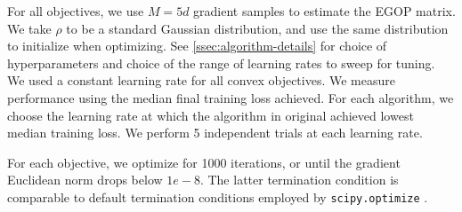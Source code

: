 For all objectives, we use $M = 5d$ gradient samples to estimate the EGOP matrix. We take $\rho$ to be a standard Gaussian distribution, and use the same distribution to initialize when optimizing. See \cref{ssec:algorithm-details} for choice of  hyperparameters and choice of the range of learning rates to sweep for tuning. We used a constant learning rate for all convex objectives. We measure performance using the median final training loss achieved. For each algorithm, we choose the learning rate at which the algorithm in original achieved lowest median training loss. We perform 5 independent trials at each learning rate.

For each objective, we optimize for 1000 iterations, or until the gradient Euclidean norm drops below $1e-8$. The latter termination condition is comparable to default termination conditions employed by \texttt{scipy.optimize} \cite{2020SciPy-NMeth}.






